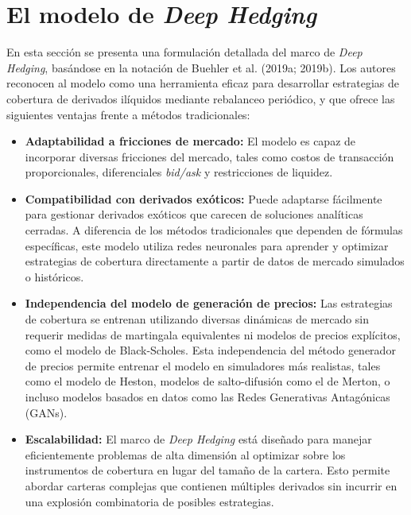 \documentclass[11pt,a4paper,spanish]{article}
\numberwithin{equation}{section} %
\begin{document}
\newpage


\section{El modelo de \textit{Deep Hedging}}\label{sec:deep_hedging}

En esta sección se presenta una formulación detallada del marco de \textit{Deep Hedging}, basándose en la notación de Buehler et al. (2019a; 2019b). Los autores reconocen al modelo como una herramienta eficaz para desarrollar estrategias de cobertura de derivados ilíquidos mediante rebalanceo periódico, y que ofrece las siguientes ventajas frente a métodos tradicionales:

\begin{itemize} 
\item \textbf{Adaptabilidad a fricciones de mercado:} El modelo es capaz de incorporar diversas fricciones del mercado, tales como costos de transacción proporcionales, diferenciales \textit{bid/ask} y restricciones de liquidez. 

\item \textbf{Compatibilidad con derivados exóticos:} Puede adaptarse fácilmente para gestionar derivados exóticos que carecen de soluciones analíticas cerradas. A diferencia de los métodos tradicionales que dependen de fórmulas específicas, este modelo utiliza redes neuronales para aprender y optimizar estrategias de cobertura directamente a partir de datos de mercado simulados o históricos. 

\item \textbf{Independencia del modelo de generación de precios:} Las estrategias de cobertura se entrenan utilizando diversas dinámicas de mercado sin requerir medidas de martingala equivalentes ni modelos de precios explícitos, como el modelo de Black-Scholes. Esta independencia del método generador de precios permite entrenar el modelo en simuladores más realistas, tales como el modelo de Heston, modelos de salto-difusión como el de Merton, o incluso modelos basados en datos como las Redes Generativas Antagónicas (GANs).

\item \textbf{Escalabilidad:} El marco de \textit{Deep Hedging} está diseñado para manejar eficientemente problemas de alta dimensión al optimizar sobre los instrumentos de cobertura en lugar del tamaño de la cartera. Esto permite abordar carteras complejas que contienen múltiples derivados sin incurrir en una explosión combinatoria de posibles estrategias.

\end{itemize}
\end{document}
